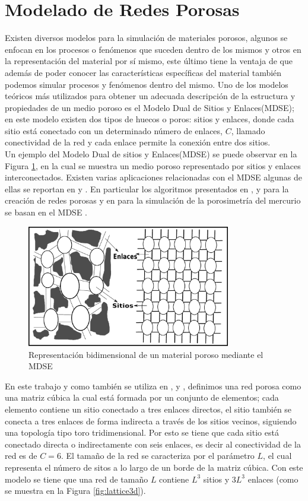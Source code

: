 \section{Modelado de Redes Porosas}
\label{sec:model}
Existen diversos modelos para la simulación de materiales porosos, algunos se enfocan en los procesos o fenómenos que suceden dentro de los mismos y otros en la representación del material por s\'i mismo, este último tiene la ventaja de que además de poder conocer las características espec\'ificas del material también podemos simular procesos y fenómenos dentro del mismo. Uno de los modelos teóricos m\'as utilizados para obtener un adecuada descripción de la estructura y propiedades de un medio poroso es el Modelo Dual de Sitios y Enlaces(MDSE)\cite{ref2}; en este modelo existen dos tipos de huecos o poros: sitios y enlaces, donde cada sitio está conectado con un determinado número de enlaces, $C$, llamado conectividad de la red y cada enlace permite la conexión entre dos sitios.\\

Un ejemplo del Modelo Dual de sitios y Enlaces(MDSE) se puede observar en la Figura \ref{fig:dbsm}, en la cual se muestra un medio poroso representado por sitios y enlaces interconectados. Existen varias aplicaciones relacionadas con el MDSE algunas de ellas se reportan en \cite{ref8} y \cite{ref10}. En particular los algoritmos presentados en \cite{ref2}, \cite{ref3} y \cite{ref4} para la creación de redes porosas y en \cite{ref7} para la simulación de la porosimetría del mercurio se basan en el MDSE \cite{ref1}.\\

\begin{figure}[hbtp]
\centering
\includegraphics[width=3.5in]{img/dsbm_es.pdf}
\caption{Representación bidimensional de un material poroso mediante el MDSE}
\label{fig:dbsm}
\end{figure}

En este trabajo y como también se utiliza en \cite{ref2}, \cite{ref3} y \cite{ref4}, definimos una red porosa como una matriz cúbica la cual está formada por un conjunto de elementos; cada elemento contiene un sitio conectado a tres enlaces directos, el sitio tambi\'en se conecta a tres enlaces de forma indirecta a través de los sitios vecinos, siguiendo una topología tipo toro tridimensional. Por esto se tiene que cada sitio est\'a conectado directa o indirectamente con seis enlaces, es decir al conectividad de la red es de $C=6$. El tamaño de la red se caracteriza por el parámetro $L$, el cual representa el número de sitos a lo largo de un borde de la matriz cúbica. Con este modelo se tiene que una red de tamaño $L$ contiene $L^3$ sitios y $3L^3$ enlaces (como se muestra en la Figura \ref{fig:lattice3d}).

